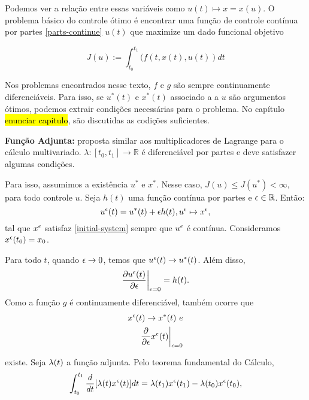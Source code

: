 Podemos ver a relação entre essas variáveis
como $u(t) \mapsto x = x(u)$.  O problema básico do controle ótimo é encontrar
uma função de controle contínua por partes \ref{parts-continue} $u(t)$ que
maximize um dado funcional objetivo 

\begin{equation}
    \label{objetivo}
    J(u) := \int_{t_0}^{t_1} (f(t,x(t),u(t))dt    
\end{equation}

Nos problemas encontrados nesse texto, $f$ e $g$ são sempre continuamente
diferenciáveis. Para isso, se $u^{*}(t)$ e $x^*(t)$ associado a a $u$ são
argumentos ótimos, podemos extrair condições necessárias para o problema. No
capítulo \hl{enunciar capitulo}, são discutidas as codições suficientes. 

\textbf{Função Adjunta:} proposta similar aos multiplicadores de Lagrange para
o cálculo multivariado. $\lambda : [t_0,t_1] \to \mathbb{R}$ é diferenciável
por partes e deve satisfazer algumas condições. 

Para isso, assumimos a existência $u^*$ e $x^*$. Nesse caso, $J(u) \leq J(u^*)
< \infty$, para todo controle $u$. Seja $h(t)$ uma função contínua por partes
e $\epsilon \in \mathbb{R}$.  Então: 
\begin{equation}
    u^{\epsilon}(t) = u^*(t) + \epsilon h(t), u^{\epsilon} \mapsto x^{\epsilon}, 
\end{equation}
tal que $x^{\epsilon}$ satisfaz \ref{initial-system} sempre que $u^{\epsilon}$ é contínua. Consideramos $x^{\epsilon}(t_0) = x_0$.

Para todo $t$, quando $\epsilon \to 0$, temos que $u^{\epsilon}(t) \to u^*(t)$. Além disso, 
\begin{equation*}
    \frac{\partial u^{\epsilon}(t)}{\partial \epsilon}\bigg\rvert_{\epsilon = 0} = h(t).
\end{equation*}
Como a função $g$ é continuamente diferenciável, também ocorre que
\begin{equation*}
    \begin{split}
        x^{\epsilon}(t) \to x^*(t)~e \\
        \frac{\partial}{\partial \epsilon}x^{\epsilon}(t)\bigg\rvert_{\epsilon = 0}
    \end{split}
\end{equation*}

existe. Seja $\lambda(t)$ a função adjunta. Pelo teorema fundamental do Cálculo, 
\begin{equation*}
    \int_{t_0}^{t_1} \frac{d}{dt}[\lambda(t)x^{\epsilon}(t)]dt = \lambda(t_1)x^{\epsilon}(t_1) - \lambda(t_0)x^{\epsilon}(t_0),
\end{equation*}

